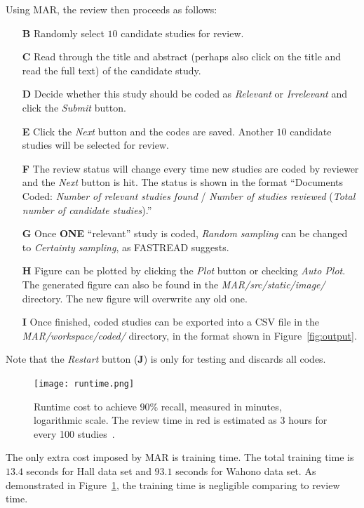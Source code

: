 \documentclass[final,twocolumn,5p]{elsarticle}
\theoremstyle{break}
\begin{document}
Using MAR, the review then proceeds as follows:
\begin{enumerate}
\item[\textbf{B}] Randomly select $10$ candidate studies for review.
\item[\textbf{C}] Read through the title and abstract (perhaps also click on the title and read the full text) of the candidate study.
\item[\textbf{D}] Decide whether this study should be coded as \textit{Relevant} or \textit{Irrelevant} and click the \textit{Submit} button.
\item[\textbf{E}] Click the \textit{Next} button and the codes are saved. Another $10$ candidate studies will be selected for review.
\item[\textbf{F}] The review status will change every time new studies are coded by reviewer and the \textit{Next} button is hit. The status is shown in the format ``Documents Coded: \textit{Number of relevant studies found} / \textit{Number of studies reviewed} (\textit{Total number of candidate studies}).''
\item[\textbf{G}] Once \textbf{ONE} ``relevant'' study is coded, \textit{Random sampling} can be changed to \textit{Certainty sampling}, as FASTREAD suggests.
\item[\textbf{H}] Figure can be plotted by clicking the \textit{Plot} button or checking \textit{Auto Plot}. The generated figure can also be found in the \textit{MAR/src/static/image/} directory. The new figure will overwrite any old one.
\item[\textbf{I}] Once finished, coded studies can be exported into a CSV file in the \textit{MAR/workspace/coded/} directory, in the format shown in Figure~\ref{fig:output}.
\end{enumerate}

Note that the \textit{Restart} button (\textbf{J}) is only for testing and discards all codes.

\begin{figure}[ht]
    \centering
    \texttt{[image: runtime.png]}    
    \caption{Runtime cost to achieve $90\%$ recall, measured in minutes, logarithmic scale. The review time in red is estimated as 3 hours for every 100 studies~\cite{malheiros2007visual}.}
    \label{fig:runtime}
\end{figure}

The only extra cost imposed by MAR is training time. The total training time is $13.4$ seconds for Hall data set and $93.1$ seconds for Wahono data set. As demonstrated in Figure~\ref{fig:runtime}, the training time is negligible comparing to review time.
\end{document}

